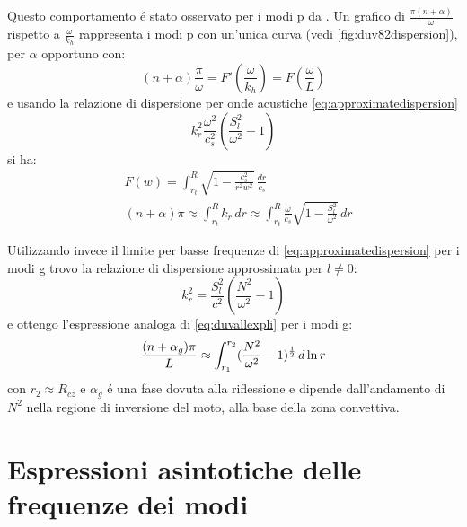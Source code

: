 \documentclass[../main.tex]{subfiles}
\begin{document}
Questo comportamento \'e stato osservato per i modi p da \citet{duv82dispersion}. Un grafico di $\frac{\pi(n+\alpha)}{\omega}$ rispetto a $\frac{\omega}{k_h}$ rappresenta i modi p con un'unica curva (vedi \ref{fig:duv82dispersion}), per $\alpha$ opportuno con:
\begin{equation}
(n+\alpha)\frac{\pi}{\omega}=F'(\frac{\omega}{k_h})=F(\frac{\omega}{L})\label{eq:duvallr}
\end{equation}
e usando la relazione di dispersione per onde acustiche \eqref{eq:approximatedispersion}
\begin{equation}
k_r^2\frac{\omega^2}{c_s^2}(\frac{S_l^2}{\omega^2}-1)
\end{equation}
si ha:
\begin{align}
&F(w)=\int_{r_t}^R\sqrt{1-\frac{c_s^2}{r^2w^2}}\,\frac{dr}{c_s}\label{eq:duvallf}\\
&(n+\alpha)\pi\approx\int_{r_t}^Rk_r\,dr\approx\int_{r_t}^R\frac{\omega}{c_s}\sqrt{1-\frac{S_l^2}{\omega^2}}\,dr\label{eq:duvallexpli}
\end{align}

Utilizzando invece il limite per basse frequenze di \eqref{eq:approximatedispersion} per i modi g trovo la relazione di dispersione approssimata per $l\neq0$:
\begin{equation}
k_r^2=\frac{S_l^2}{c^2}(\frac{N^2}{\omega^2}-1)\label{eq:dispersionag}
\end{equation}
e ottengo l'espressione analoga di \eqref{eq:duvallexpli} per i modi g:
\begin{equation}\label{eq:duvallg}
\frac{(n+\alpha_g)\pi}{L}\approx\int_{r_1}^{r_2}(\frac{N^2}{\omega^2}-1)^{\frac{1}{2}}\,d\ln{r}
\end{equation}
con $r_2\approx R_{cz}$ e $\alpha_g$ \'e una fase dovuta alla riflessione e dipende dall'andamento di $N^2$ nella regione di inversione del moto, alla base della zona convettiva.

\section{Espressioni asintotiche delle frequenze dei modi}

\end{document}
